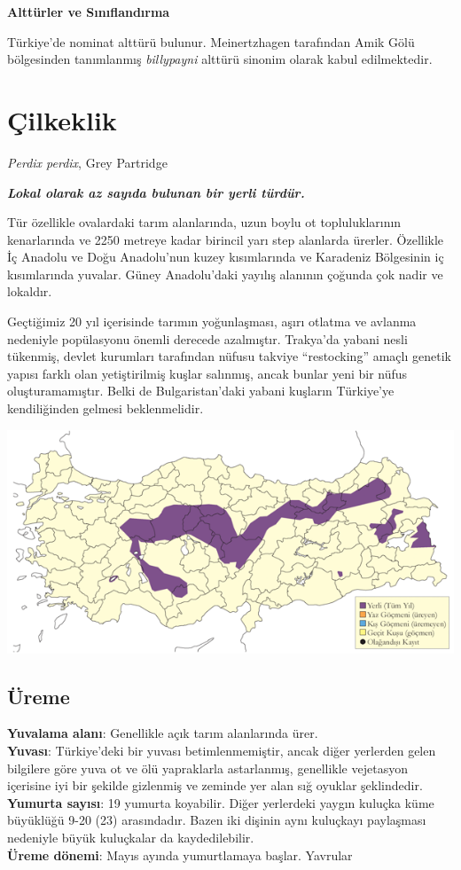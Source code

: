 \documentclass[
  letterpaper,
  DIV=11,
  numbers=noendperiod]{scrreprt}
\begin{document}
\textbf{Alttürler ve Sınıflandırma}

Türkiye'de nominat alttürü bulunur. Meinertzhagen tarafından Amik Gölü
bölgesinden tanımlanmış \emph{billypayni} alttürü sinonim olarak kabul
edilmektedir.

\section{Çilkeklik}\label{uxe7ilkeklik}

\emph{Perdix perdix}, Grey Partridge

\textbf{\emph{Lokal olarak az sayıda bulunan bir yerli türdür.}}

Tür özellikle ovalardaki tarım alanlarında, uzun boylu ot
topluluklarının kenarlarında ve 2250 metreye kadar birincil yarı step
alanlarda ürerler. Özellikle İç Anadolu ve Doğu Anadolu'nun kuzey
kısımlarında ve Karadeniz Bölgesinin iç kısımlarında yuvalar. Güney
Anadolu'daki yayılış alanının çoğunda çok nadir ve lokaldır.

Geçtiğimiz 20 yıl içerisinde tarımın yoğunlaşması, aşırı otlatma ve
avlanma nedeniyle popülasyonu önemli derecede azalmıştır. Trakya'da
yabani nesli tükenmiş, devlet kurumları tarafından nüfusu takviye
``restocking'' amaçlı genetik yapısı farklı olan yetiştirilmiş kuşlar
salınmış, ancak bunlar yeni bir nüfus oluşturamamıştır. Belki de
Bulgaristan'daki yabani kuşların Türkiye'ye kendiliğinden gelmesi
beklenmelidir.

\includegraphics{images/harita_Page_042.png}

\subsection{\texorpdfstring{\textbf{Üreme}}{Üreme}}\label{uxfcreme-6}

\textbf{Yuvalama alanı}: Genellikle açık tarım alanlarında ürer.\\
\textbf{Yuvası}: Türkiye'deki bir yuvası betimlenmemiştir, ancak diğer
yerlerden gelen bilgilere göre yuva ot ve ölü yapraklarla astarlanmış,
genellikle vejetasyon içerisine iyi bir şekilde gizlenmiş ve zeminde yer
alan sığ oyuklar şeklindedir.\\
\textbf{Yumurta sayısı}: 19 yumurta koyabilir. Diğer yerlerdeki yaygın
kuluçka küme büyüklüğü 9-20 (23) arasındadır. Bazen iki dişinin aynı
kuluçkayı paylaşması nedeniyle büyük kuluçkalar da kaydedilebilir.\\
\textbf{Üreme dönemi}: Mayıs ayında yumurtlamaya başlar. Yavrular
\end{document}
